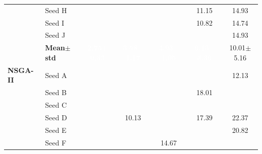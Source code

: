 \begin{table}[H]
{\begin{tabular}{@{}llccccc@{}}
 & Seed H & \cellcolor{RoyalBlue!10}{\small 3.13} & \cellcolor{RoyalBlue!10}{\small 5.16} & \cellcolor{RoyalBlue!10}{\small 4.02} & {\small\color{gray!60!black}11.15} & {\small\color{gray!60!black}14.93} \\
 & Seed I & \cellcolor{RoyalBlue!10}{\small 2.07} & \cellcolor{RoyalBlue!10}{\small 2.70} & \cellcolor{RoyalBlue!10}{\small 3.29} & {\small\color{gray!60!black}10.82} & {\small\color{gray!60!black}14.74} \\
 & Seed J & \cellcolor{RoyalBlue!10}{\small 2.49} & \cellcolor{RoyalBlue!10}{\small 2.56} & \cellcolor{RoyalBlue!10}{\small 3.13} & \cellcolor{RoyalBlue!10}{\small 3.48} & {\small\color{gray!60!black}14.93} \\
 & \textbf{Mean$\pm$std} & \cellcolor{RoyalBlue!65}\textcolor{white}{\textbf{2.75$\pm$0.33}} & \cellcolor{RoyalBlue!65}\textcolor{white}{\textbf{3.58$\pm$1.17}} & \cellcolor{RoyalBlue!65}\textcolor{white}{\textbf{4.93$\pm$1.95}} & \cellcolor{RoyalBlue!65}\textcolor{white}{\textbf{6.13$\pm$3.36}} & \cellcolor{red!12}10.01$\pm$5.16 \\
\midrule
\textbf{NSGA-II} & Seed A & \cellcolor{RoyalBlue!10}{\small 2.03} & \cellcolor{RoyalBlue!10}{\small 4.58} & \cellcolor{RoyalBlue!10}{\small 6.73} & \cellcolor{RoyalBlue!10}{\small 9.17} & {\small\color{gray!60!black}12.13} \\
 & Seed B & \cellcolor{RoyalBlue!10}{\small 4.77} & \cellcolor{RoyalBlue!10}{\small 4.23} & \cellcolor{RoyalBlue!10}{\small 6.52} & {\small\color{gray!60!black}18.01} & \cellcolor{RoyalBlue!10}{\small 8.50} \\
 & Seed C & \cellcolor{RoyalBlue!10}{\small 4.89} & \cellcolor{RoyalBlue!10}{\small 9.27} & \cellcolor{RoyalBlue!10}{\small 5.41} & \cellcolor{RoyalBlue!10}{\small 5.37} & \cellcolor{RoyalBlue!10}{\small 5.19} \\
 & Seed D & \cellcolor{RoyalBlue!10}{\small 7.11} & {\small\color{gray!60!black}10.13} & \cellcolor{RoyalBlue!10}{\small 5.45} & {\small\color{gray!60!black}17.39} & {\small\color{gray!60!black}22.37} \\
 & Seed E & \cellcolor{RoyalBlue!10}{\small 5.41} & \cellcolor{RoyalBlue!10}{\small 7.70} & \cellcolor{RoyalBlue!10}{\small 6.94} & \cellcolor{RoyalBlue!10}{\small 7.71} & {\small\color{gray!60!black}20.82} \\
 & Seed F & \cellcolor{RoyalBlue!10}{\small 4.26} & \cellcolor{RoyalBlue!10}{\small 9.04} & {\small\color{gray!60!black}14.67} & \cellcolor{RoyalBlue!10}{\small 7.17} & \cellcolor{RoyalBlue!10}{\small 6.26} \\

\end{tabular}}
\end{table}
